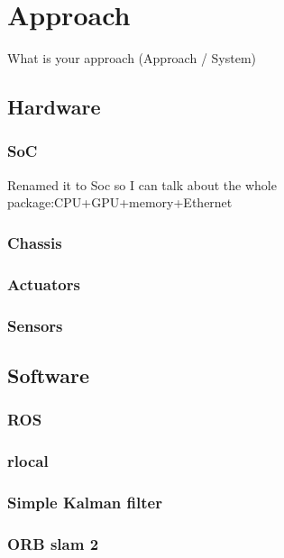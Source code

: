 \chapter{Approach}\label{cha:approach}
\pagestyle{scrheadings}


What is your approach (Approach / System)
\section{Hardware}\label{sec:hardware}

\subsection{SoC}\label{subsec:soc}
Renamed it to Soc so I can talk about the whole package:CPU+GPU+memory+Ethernet

\subsection{Chassis}\label{subsec:chassis}

\subsection{Actuators}\label{subsec:actuators}

\subsection{Sensors}\label{subsec:sensors}


\section{Software}\label{sec:software}

\subsection{ROS}\label{subsec:ros}

\subsection{rlocal}\label{subsec:robot_localization}

\subsection{Simple Kalman filter}\label{subsec:simple_kalman}

\subsection{ORB slam 2}\label{subsec:orbslam2}





